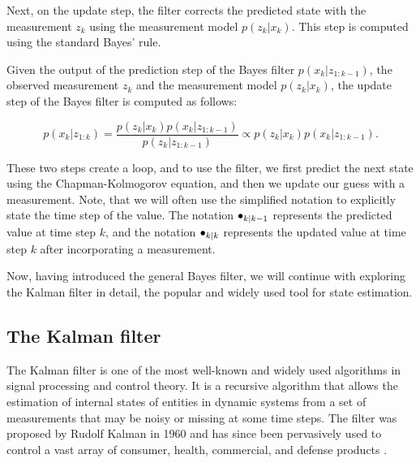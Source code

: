 Next, on the update step, the filter corrects the predicted state with the 
measurement $z_k$ using the measurement model $p(z_k | x_k)$. This step is
computed using the standard Bayes' rule.

\begin{theorem}\label{theorem:bayes-filter-update}
    Given the output of the prediction step of the Bayes filter 
    $p\left({x}_k | {z}_{1: k-1}\right)$, the observed measurement $z_k$
    and the measurement model $p(z_k | x_k)$, the update step of the Bayes
    filter is computed as follows:
    
    \begin{equation}
        p\left({x}_k | {z}_{1: k}\right)=\frac{p\left({z}_k | {x}_k\right) p\left({x}_k | {z}_{1: k-1}\right)}{p\left({z}_k | {z}_{1: k-1}\right)} \propto p\left({z}_k | {x}_k\right) p\left({x}_k | {z}_{1: k-1}\right).
    \end{equation}
\end{theorem}

These two steps create a loop, and to use the filter, we first predict the next state using the Chapman-Kolmogorov equation, and then we update our guess with a measurement. Note, that we will often use the simplified notation to explicitly state the time step of the value. The notation $\vecat{\bullet}{k|k-1}$ represents the predicted value at time step $k$, and the notation $\vecat{\bullet}{k|k}$ represents the updated value at time step $k$ after incorporating a measurement.

Now, having introduced the general Bayes filter, we will continue with 
exploring the Kalman filter in detail, the popular and widely used tool for 
state estimation.

\subsection{The Kalman filter}

The Kalman filter is one of the most well-known and widely used algorithms in 
signal processing and control theory. It is a recursive algorithm that allows 
the estimation of internal states of entities in dynamic systems from a set of 
measurements that may be noisy or missing at some time steps. The filter was 
proposed by Rudolf Kalman in 1960 \cite{kalmanNewApproachLinear1960} and has 
since been pervasively used to control a vast array of consumer, health, 
commercial, and defense products \cite{grewalApplicationsKalmanFiltering2010}.

